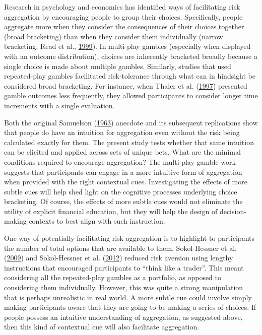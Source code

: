 \documentclass[
  english,
  man, donotrepeattitle,floatsintext]{apa7}
\theoremstyle{definition}
\theoremstyle{definition}
\theoremstyle{definition}
\theoremstyle{definition}
\theoremstyle{remark}
\begin{document}
Research in psychology and economics has identified ways of facilitating risk
aggregation by encouraging people to group their choices. Specifically, people
aggregate more when they consider the consequences of their choices together
(broad bracketing) than when they consider them individually (narrow
bracketing; Read et al., \protect\hyperlink{ref-read1999}{1999}). In multi-play gambles (especially when displayed with
an outcome distribution), choices are inherently bracketed broadly because a
single choice is made about multiple gambles. Similarly, studies that used
repeated-play gambles facilitated risk-tolerance through what can in hindsight
be considered broad bracketing. For instance, when Thaler et al. (\protect\hyperlink{ref-thaler1997}{1997}) presented gamble
outcomes less frequently, they allowed participants to consider longer time
increments with a single evaluation.

Both the original Samuelson (\protect\hyperlink{ref-samuelson1963}{1963}) anecdote and its subsequent replications show
that people do have an intuition for aggregation even without the risk being
calculated exactly for them. The present study tests whether that same intuition can
be elicited and applied across sets of unique bets. What are the minimal
conditions required to encourage aggregation? The multi-play gamble work
suggests that participants can engage in a more intuitive form of aggregation
when provided with the right contextual cues. Investigating the effects of more
subtle cues will help shed light on the cognitive processes underlying choice
bracketing. Of course, the effects of more subtle cues would not eliminate the
utility of explicit financial education, but they will help the design of
decision-making contexts to best align with such instruction.

One way of potentially facilitating risk aggregation is to highlight to
participants the number of total options that are available to them.
Sokol-Hessner et al. (\protect\hyperlink{ref-sokolhessner2009}{2009}) and Sokol-Hessner et al. (\protect\hyperlink{ref-sokolhessner2012}{2012}) reduced risk aversion using lengthy
instructions that encouraged participants to ``think like a trader''. This meant
considering all the repeated-play gambles as a portfolio, as opposed to
considering them individually. However, this was quite a strong manipulation
that is perhaps unrealistic in real world. A more subtle cue could involve
simply making participants aware that they are going to be making a series of
choices. If people possess an intuitive understanding of aggregation, as
suggested above, then this kind of contextual cue will also facilitate
aggregation.
\end{document}
